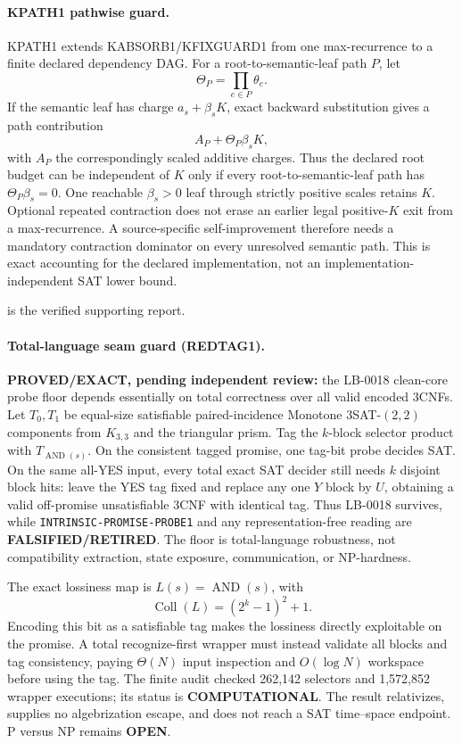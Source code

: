 \documentclass[11pt]{article}
\begin{document}
\paragraph{KPATH1 pathwise guard.}
KPATH1 extends KABSORB1/KFIXGUARD1 from one max-recurrence to a finite declared dependency DAG. For a root-to-semantic-leaf path \(P\), let
\[
\Theta_P=\prod_{e\in P}\theta_e.
\]
If the semantic leaf has charge \(a_s+\beta_sK\), exact backward substitution gives a path contribution
\[
A_P+\Theta_P\beta_sK,
\]
with \(A_P\) the correspondingly scaled additive charges. Thus the declared root budget can be independent of \(K\) only if every root-to-semantic-leaf path has \(\Theta_P\beta_s=0\). One reachable \(\beta_s>0\) leaf through strictly positive scales retains \(K\). Optional repeated contraction does not erase an earlier legal positive-\(K\) exit from a max-recurrence. A source-specific self-improvement therefore needs a mandatory contraction dominator on every unresolved semantic path. This is exact accounting for the declared implementation, not an implementation-independent SAT lower bound.

 is the verified supporting report.

\paragraph{Total-language seam guard (REDTAG1).}
\textbf{PROVED/EXACT, pending independent review:} the LB-0018 clean-core probe floor depends essentially on total correctness over all valid encoded \(3\)CNFs.  Let \(T_0,T_1\) be equal-size satisfiable paired-incidence Monotone \(3\)SAT-\((2,2)\) components from \(K_{3,3}\) and the triangular prism.  Tag the \(k\)-block selector product with \(T_{\operatorname{AND}(s)}\).  On the consistent tagged promise, one tag-bit probe decides SAT.  On the same all-YES input, every total exact SAT decider still needs \(k\) disjoint block hits: leave the YES tag fixed and replace any one \(Y\) block by \(U\), obtaining a valid off-promise unsatisfiable \(3\)CNF with identical tag.  Thus LB-0018 survives, while \texttt{INTRINSIC-PROMISE-PROBE1} and any representation-free reading are \textbf{FALSIFIED/RETIRED}.  The floor is total-language robustness, not compatibility extraction, state exposure, communication, or NP-hardness.

The exact lossiness map is \(L(s)=\operatorname{AND}(s)\), with
\[
 \operatorname{Coll}(L)=(2^k-1)^2+1.
\]
Encoding this bit as a satisfiable tag makes the lossiness directly exploitable on the promise.  A total recognize-first wrapper must instead validate all blocks and tag consistency, paying \(\Theta(N)\) input inspection and \(O(\log N)\) workspace before using the tag.  The finite audit checked 262,142 selectors and 1,572,852 wrapper executions; its status is \textbf{COMPUTATIONAL}.  The result relativizes, supplies no algebrization escape, and does not reach a SAT time--space endpoint.  P versus NP remains \textbf{OPEN}.
\end{document}
